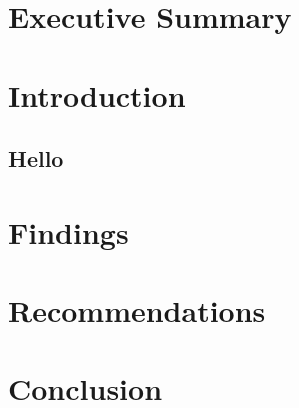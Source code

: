 \section{Executive Summary}
\blindtext

\section{Introduction}
\blindtext
\blindtext
\subsection{Hello}
\blindtext

\section{Findings}
\blindtext

\section{Recommendations} 
\blindtext

\section{Conclusion}
\blindtext
